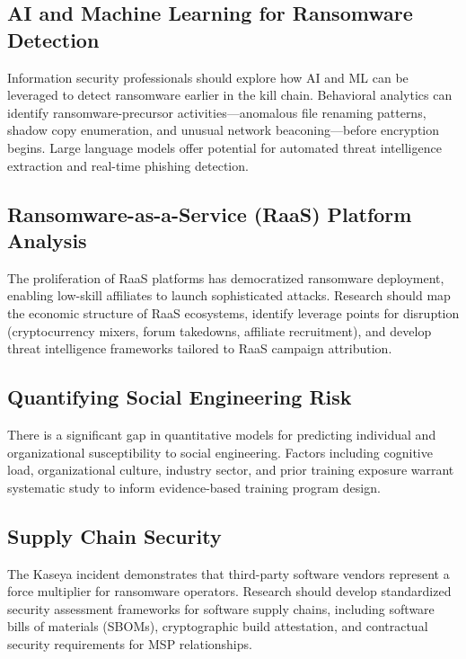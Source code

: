 \documentclass[sigconf,nonacm]{acmart}
\begin{document}
\subsection{AI and Machine Learning for Ransomware Detection}

Information security professionals should explore how AI and ML can be leveraged to
detect ransomware earlier in the kill chain. Behavioral analytics can identify
ransomware-precursor activities---anomalous file renaming patterns, shadow copy
enumeration, and unusual network beaconing---before encryption begins. Large language
models offer potential for automated threat intelligence extraction and real-time
phishing detection.

\subsection{Ransomware-as-a-Service (RaaS) Platform Analysis}

The proliferation of RaaS platforms has democratized ransomware deployment, enabling
low-skill affiliates to launch sophisticated attacks. Research should map the economic
structure of RaaS ecosystems, identify leverage points for disruption (cryptocurrency
mixers, forum takedowns, affiliate recruitment), and develop threat intelligence
frameworks tailored to RaaS campaign attribution.

\subsection{Quantifying Social Engineering Risk}

There is a significant gap in quantitative models for predicting individual and
organizational susceptibility to social engineering. Factors including cognitive load,
organizational culture, industry sector, and prior training exposure warrant systematic
study to inform evidence-based training program design.

\subsection{Supply Chain Security}

The Kaseya incident demonstrates that third-party software vendors represent a force
multiplier for ransomware operators. Research should develop standardized security
assessment frameworks for software supply chains, including software bills of materials
(SBOMs), cryptographic build attestation, and contractual security requirements for
MSP relationships.
\end{document}
